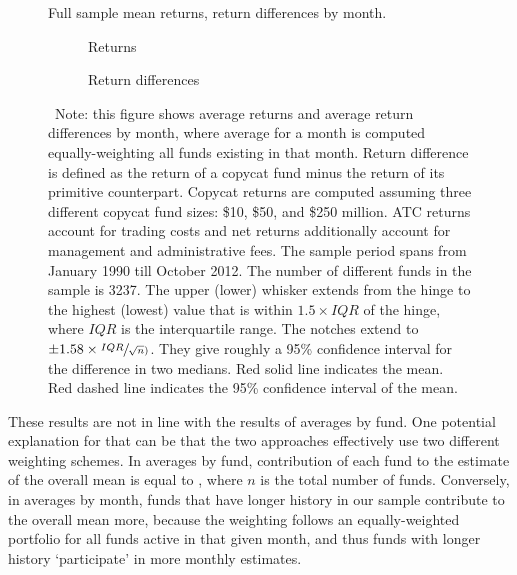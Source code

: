 \documentclass[12pt, a4]{article}
\begin{document}
\begin{figure}
	\centering
	\caption{Full sample mean returns, return differences by month.}
	\label{fig:boxplot-returns-months}
	\begin{subfigure}[t]{\linewidth}
		
		\caption{Returns}
		\label{fig:boxplot-returns-months-return}
	\end{subfigure}
	
	\begin{subfigure}[b]{\linewidth}
		
		\caption{Return differences}
		\label{fig:boxplot-returns-months-diff}	
	\end{subfigure}
	\caption*{\scriptsize ~Note: this figure shows average returns and average return differences by month, where average for a month is computed equally-weighting all funds existing in that month. Return difference is defined as the return of a copycat fund minus the return of its primitive counterpart. Copycat returns are computed assuming three different copycat fund sizes: \$10, \$50, and \$250 million. \textsc{ATC} returns account for trading costs and net returns additionally account for management and administrative fees. The sample period spans from January 1990 till October 2012. The number of different funds in the sample is 3237. The upper (lower) whisker extends from the hinge to the highest (lowest) value that is within $1.5 \times IQR$ of the hinge, where $IQR$ is the interquartile range. The notches extend to $\pm 1.58 \times \sfrac{IQR}{\sqrt{n})}$. They give roughly a 95\% confidence interval for the difference in two medians. Red solid line indicates the mean. Red dashed line indicates the 95\% confidence interval of the mean.}
\end{figure}

These results are not in line with the results of averages by fund. One potential explanation for that can be that the two approaches effectively use two different weighting schemes. In averages by fund, contribution of each fund to the estimate of the overall mean is equal to , where $n$ is the total number of funds. Conversely, in averages by month, funds that have longer history in our sample contribute to the overall mean more, because the weighting follows an equally-weighted portfolio for all funds active in that given month, and thus funds with longer history `participate' in more monthly estimates. 
\end{document}

